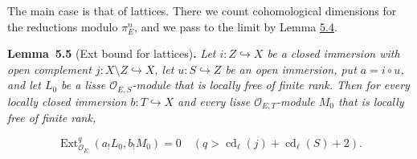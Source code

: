 \documentclass[11pt]{article}
\newenvironment{bpstatement}[2]{\par\addvspace{0.6\baselineskip}\noindent\textbf{#1}#2\textbf{.}\enspace\ignorespaces}
  {\par\addvspace{0.4\baselineskip}}
\newenvironment{bpstatementit}[2]{\begin{bpstatement}{#1}{#2}\itshape\ignorespaces}{\end{bpstatement}}
\providecommand{\Ext}{}\renewcommand{\Ext}{\operatorname{Ext}}
\begin{document}
\label{bp17}%
The main case is that of lattices. There we count cohomological dimensions for the reductions modulo \(\pi_E^n\), and we pass to the limit by Lemma \hyperref[bp15]{5.4}.

\label{bp18}%
\begin{bpstatementit}{Lemma~5.5}{ (Ext bound for lattices)}
Let \(i:Z\hookrightarrow X\) be a closed immersion with open complement \(j:X\setminus Z\hookrightarrow X\), let \(u:S\hookrightarrow Z\) be an open immersion, put \(a=i\circ u\), and let \(L_0\) be a lisse \(\mathcal O_{E,S}\)-module that is locally free of finite rank. Then for every locally closed immersion \(b:T\hookrightarrow X\) and every lisse \(\mathcal O_{E,T}\)-module \(M_0\) that is locally free of finite rank,

\[
\Ext^q_{\mathcal O_E}(a_!L_0,b_!M_0)=0
\quad(q>\operatorname{cd}_\ell(j)+\operatorname{cd}_\ell(S)+2).
\tag{5.1}
\]
\end{bpstatementit}
\end{document}
